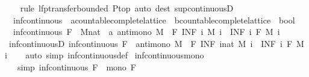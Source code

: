 \begin{isabellebody}
%
\isadelimproof
\ \ %
\endisadelimproof
%
\isatagproof
{}\isamarkupfalse%
\ {\isacharparenleft}rule\ lfp{\isacharunderscore}transfer{\isacharunderscore}bounded{\isacharbrackleft}\ P{\isacharequal}top{\isacharbrackright}{\isacharparenright}\ {\isacharparenleft}auto\ dest{\isacharcolon}\ sup{\isacharunderscore}continuousD{\isacharparenright}%
\endisatagproof
{\isafoldproof}%
%
\isadelimproof
\isanewline
%
\endisadelimproof
\isanewline
{}\isamarkupfalse%
\isanewline
\ \ inf{\isacharunderscore}continuous\ {\isacharcolon}{\isacharcolon}\ {\isachardoublequoteopen}{\isacharparenleft}{\isacharprime}a{\isacharcolon}{\isacharcolon}countable{\isacharunderscore}complete{\isacharunderscore}lattice\ {\isasymRightarrow}\ {\isacharprime}b{\isacharcolon}{\isacharcolon}countable{\isacharunderscore}complete{\isacharunderscore}lattice{\isacharparenright}\ {\isasymRightarrow}\ bool{\isachardoublequoteclose}\isanewline
{}\isanewline
\ \ {\isachardoublequoteopen}inf{\isacharunderscore}continuous\ F\ {\isasymlongleftrightarrow}\ {\isacharparenleft}{\isasymforall}M{\isacharcolon}{\isacharcolon}nat\ {\isasymRightarrow}\ {\isacharprime}a{\isachardot}\ antimono\ M\ {\isasymlongrightarrow}\ F\ {\isacharparenleft}INF\ i{\isachardot}\ M\ i{\isacharparenright}\ {\isacharequal}\ {\isacharparenleft}INF\ i{\isachardot}\ F\ {\isacharparenleft}M\ i{\isacharparenright}{\isacharparenright}{\isacharparenright}{\isachardoublequoteclose}\isanewline
\isanewline
{}\isamarkupfalse%
\ inf{\isacharunderscore}continuousD{\isacharcolon}\ {\isachardoublequoteopen}inf{\isacharunderscore}continuous\ F\ {\isasymLongrightarrow}\ antimono\ M\ {\isasymLongrightarrow}\ F\ {\isacharparenleft}INF\ i{\isacharcolon}{\isacharcolon}nat{\isachardot}\ M\ i{\isacharparenright}\ {\isacharequal}\ {\isacharparenleft}INF\ i{\isachardot}\ F\ {\isacharparenleft}M\ i{\isacharparenright}{\isacharparenright}{\isachardoublequoteclose}\isanewline
%
\isadelimproof
\ \ %
\endisadelimproof
%
\isatagproof
{}\isamarkupfalse%
\ {\isacharparenleft}auto\ simp{\isacharcolon}\ inf{\isacharunderscore}continuous{\isacharunderscore}def{\isacharparenright}%
\endisatagproof
{\isafoldproof}%
%
\isadelimproof
\isanewline
%
\endisadelimproof
\isanewline
{}\isamarkupfalse%
\ inf{\isacharunderscore}continuous{\isacharunderscore}mono{\isacharcolon}\isanewline
\ \ \ {\isacharbrackleft}simp{\isacharbrackright}{\isacharcolon}\ {\isachardoublequoteopen}inf{\isacharunderscore}continuous\ F{\isachardoublequoteclose}\ \ {\isachardoublequoteopen}mono\ F{\isachardoublequoteclose}\isanewline

\end{isabellebody}
